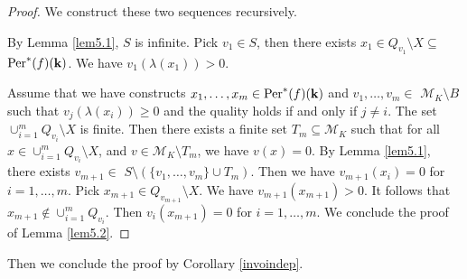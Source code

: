\documentclass[12pt]{amsart}
\theoremstyle{plain}
\theoremstyle{remark}
\theoremstyle{definition}
\begin{document}
\begin{proof}We construct these two sequences recursively.\par
	By Lemma \ref{lem5.1}, $S$ is infinite. Pick $v_{1} \in S$, then there exists $x_{1} \in Q_{v_{1}} \setminus X \subseteq$ ${\rm Per}^*(f)(\mathbf{k})$. We have $v_{1}( \lambda(x_{1}))>0$.\par
	Assume that we have constructs $x_{1},\dots,x_{m} \in {\rm Per}^*(f)(\mathbf{k})$ and $v_{1},\dots,v_{m} \in$ $\mathcal{M}_K \setminus B$ such that $v_{j}(\lambda(x_{i})) \geq 0$ and the quality holds if and only if $j\neq i$. The set $\cup_{i=1}^{m} Q_{v_{i}} \setminus X$ is finite. Then there exists a finite set $T_{m} \subseteq \mathcal{M}_K$ such that for all $x\in\cup_{i=1}^{m} Q_{v_{i}} \setminus X$, and $v \in \mathcal{M}_K \setminus T_{m}$, we have $v(x)=0$. By Lemma \ref{lem5.1}, there exists $v_{m+1} \in$ $S \setminus(\{v_{1},\dots,v_{m}\} \cup T_{m})$. Then we have $v_{m+1}(x_{i})=0$ for $i=1,\dots,m$. Pick $x_{m+1} \in Q_{v_{m+1}} \setminus X$. We have $v_{m+1}(x_{m+1})>0$. It follows that $x_{m+1} \notin \cup_{i=1}^{m} Q_{v_{i}}$. Then $v_{i}(x_{m+1})=0$ for $i=1,\dots,m$. We conclude the proof of Lemma \ref{lem5.2}.
\end{proof}Then we conclude the proof by Corollary \ref{invoindep}.
\end{document}
